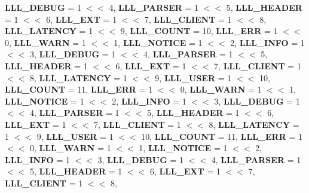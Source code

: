 \begin{DoxyCompactItemize}
\newline
{\bfseries L\+L\+L\+\_\+\+D\+E\+B\+UG} = 1 $<$$<$ 4, 
{\bfseries L\+L\+L\+\_\+\+P\+A\+R\+S\+ER} = 1 $<$$<$ 5, 
{\bfseries L\+L\+L\+\_\+\+H\+E\+A\+D\+ER} = 1 $<$$<$ 6, 
{\bfseries L\+L\+L\+\_\+\+E\+XT} = 1 $<$$<$ 7, 
\newline
{\bfseries L\+L\+L\+\_\+\+C\+L\+I\+E\+NT} = 1 $<$$<$ 8, 
{\bfseries L\+L\+L\+\_\+\+L\+A\+T\+E\+N\+CY} = 1 $<$$<$ 9, 
{\bfseries L\+L\+L\+\_\+\+C\+O\+U\+NT} = 10, 
{\bfseries L\+L\+L\+\_\+\+E\+RR} = 1 $<$$<$ 0, 
\newline
{\bfseries L\+L\+L\+\_\+\+W\+A\+RN} = 1 $<$$<$ 1, 
{\bfseries L\+L\+L\+\_\+\+N\+O\+T\+I\+CE} = 1 $<$$<$ 2, 
{\bfseries L\+L\+L\+\_\+\+I\+N\+FO} = 1 $<$$<$ 3, 
{\bfseries L\+L\+L\+\_\+\+D\+E\+B\+UG} = 1 $<$$<$ 4, 
\newline
{\bfseries L\+L\+L\+\_\+\+P\+A\+R\+S\+ER} = 1 $<$$<$ 5, 
{\bfseries L\+L\+L\+\_\+\+H\+E\+A\+D\+ER} = 1 $<$$<$ 6, 
{\bfseries L\+L\+L\+\_\+\+E\+XT} = 1 $<$$<$ 7, 
{\bfseries L\+L\+L\+\_\+\+C\+L\+I\+E\+NT} = 1 $<$$<$ 8, 
\newline
{\bfseries L\+L\+L\+\_\+\+L\+A\+T\+E\+N\+CY} = 1 $<$$<$ 9, 
{\bfseries L\+L\+L\+\_\+\+U\+S\+ER} = 1 $<$$<$ 10, 
{\bfseries L\+L\+L\+\_\+\+C\+O\+U\+NT} = 11, 
{\bfseries L\+L\+L\+\_\+\+E\+RR} = 1 $<$$<$ 0, 
\newline
{\bfseries L\+L\+L\+\_\+\+W\+A\+RN} = 1 $<$$<$ 1, 
{\bfseries L\+L\+L\+\_\+\+N\+O\+T\+I\+CE} = 1 $<$$<$ 2, 
{\bfseries L\+L\+L\+\_\+\+I\+N\+FO} = 1 $<$$<$ 3, 
{\bfseries L\+L\+L\+\_\+\+D\+E\+B\+UG} = 1 $<$$<$ 4, 
\newline
{\bfseries L\+L\+L\+\_\+\+P\+A\+R\+S\+ER} = 1 $<$$<$ 5, 
{\bfseries L\+L\+L\+\_\+\+H\+E\+A\+D\+ER} = 1 $<$$<$ 6, 
{\bfseries L\+L\+L\+\_\+\+E\+XT} = 1 $<$$<$ 7, 
{\bfseries L\+L\+L\+\_\+\+C\+L\+I\+E\+NT} = 1 $<$$<$ 8, 
\newline
{\bfseries L\+L\+L\+\_\+\+L\+A\+T\+E\+N\+CY} = 1 $<$$<$ 9, 
{\bfseries L\+L\+L\+\_\+\+U\+S\+ER} = 1 $<$$<$ 10, 
{\bfseries L\+L\+L\+\_\+\+C\+O\+U\+NT} = 11, 
{\bfseries L\+L\+L\+\_\+\+E\+RR} = 1 $<$$<$ 0, 
\newline
{\bfseries L\+L\+L\+\_\+\+W\+A\+RN} = 1 $<$$<$ 1, 
{\bfseries L\+L\+L\+\_\+\+N\+O\+T\+I\+CE} = 1 $<$$<$ 2, 
{\bfseries L\+L\+L\+\_\+\+I\+N\+FO} = 1 $<$$<$ 3, 
{\bfseries L\+L\+L\+\_\+\+D\+E\+B\+UG} = 1 $<$$<$ 4, 
\newline
{\bfseries L\+L\+L\+\_\+\+P\+A\+R\+S\+ER} = 1 $<$$<$ 5, 
{\bfseries L\+L\+L\+\_\+\+H\+E\+A\+D\+ER} = 1 $<$$<$ 6, 
{\bfseries L\+L\+L\+\_\+\+E\+XT} = 1 $<$$<$ 7, 
{\bfseries L\+L\+L\+\_\+\+C\+L\+I\+E\+NT} = 1 $<$$<$ 8, 
$$
\end{DoxyCompactItemize}
